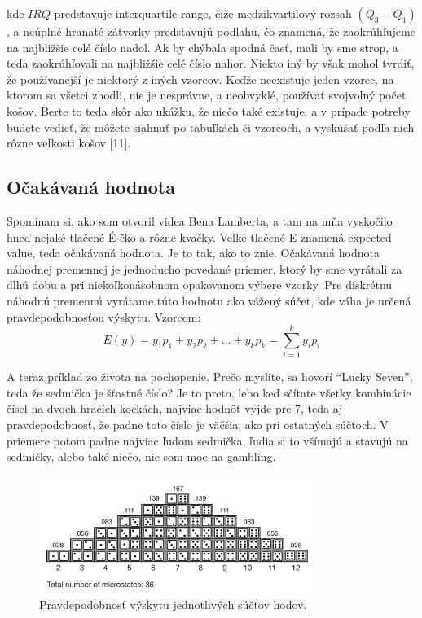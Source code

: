 kde $IRQ$ predstavuje interquartile range, čiže medzikvartilový rozsah $(Q_{3} - Q_{1})$, a neúplné hranaté zátvorky predstavujú podlahu, čo znamená, že zaokrúhľujeme na najbližšie celé číslo nadol. Ak by chýbala spodná časť, mali by sme strop, a teda zaokrúhľovali na najbližšie celé číslo nahor.
Niekto iný by však mohol tvrdiť, že používanejší je niektorý z iných vzorcov.
Keďže neexistuje jeden vzorec, na ktorom sa všetci zhodli, nie je nesprávne, a neobvyklé, používať svojvoľný počet košov. Berte to teda skôr ako ukážku, že niečo také existuje, a v prípade potreby budete vedieť, že môžete siahnuť po tabuľkách či vzorcoch, a vyskúšať podľa nich rôzne veľkosti košov [11]. 

\hypertarget{oux10dakuxe1vanuxe1-hodnota}{%
\subsection{Očakávaná hodnota}\label{oux10dakuxe1vanuxe1-hodnota}}

Spomínam si, ako som otvoril videa Bena Lamberta, a tam na mňa vyskočilo
hneď nejaké tlačené É-čko a rôzne kvačky. Veľké tlačené E znamená
expected value, teda očakávaná hodnota. Je to tak, ako to znie.
Očakávaná hodnota náhodnej premennej je jednoducho povedané priemer,
ktorý by sme vyrátali za dlhú dobu a pri niekoľkonásobnom opakovanom
výbere vzorky. Pre diskrétnu náhodnú premennú vyrátame túto hodnotu ako
vážený súčet, kde váha je určená pravdepodobnosťou výskytu. Vzorcom:
\[E(y)= y_1p_1 + y_2p_2 + ... + y_kp_k = \sum_{i=1}^{k}y_ip_i\]

A teraz príklad zo života na pochopenie. Prečo myslíte, sa hovorí
``Lucky Seven'', teda že sedmička je šťastné číslo? Je to preto, lebo
keď sčítate všetky kombinácie čísel na dvoch hracích kockách, najviac
hodnôt vyjde pre 7, teda aj pravdepodobnosť, že padne toto číslo je
väčšia, ako pri ostatných súčtoch. V priemere potom padne najviac ľudom
sedmička, ľudia si to všímajú a stavujú na sedmičky, alebo také niečo,
nie som moc na gambling.

\begin{figure}
\begin{center}

\includegraphics[width=0.8\textwidth,height=\textheight]{diplomka obrazky/5.png}
\caption{Pravdepodobnosť výskytu jednotlivých súčtov hodov.}
\end{center}
\end{figure}

